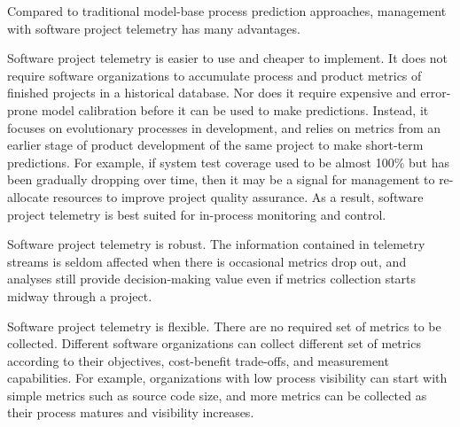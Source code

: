 Compared to traditional model-base process prediction approaches, management with software project telemetry has many advantages. 

Software project telemetry is easier to use and cheaper to implement. It does not require software organizations to accumulate process and product metrics of finished projects in a historical database. Nor does it require expensive and error-prone model calibration before it can be used to make predictions. Instead, it focuses on evolutionary processes in development, and relies on metrics from an earlier stage of product development of the same project to make short-term predictions. For example, if system test coverage used to be almost 100\% but has been gradually dropping over time, then it may be a signal for management to re-allocate resources to improve project quality assurance. As a result, software project telemetry is best suited for in-process monitoring and control.

Software project telemetry is robust. The information contained in telemetry streams is seldom affected when there is occasional metrics drop out, and analyses still provide decision-making value even if metrics collection starts midway through a project. 

Software project telemetry is flexible. There are no required set of metrics to be collected. Different software organizations can collect different set of metrics according to their objectives, cost-benefit trade-offs, and measurement capabilities. For example, organizations with low process visibility can start with simple metrics such as source code size, and more metrics can be collected as their process matures and visibility increases.

%

